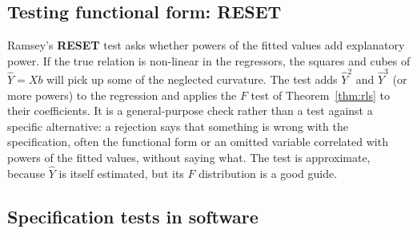 \documentclass[11pt,a4paper]{article}
\numberwithin{equation}{section}
\theoremstyle{definition}
\begin{document}
\subsection{Testing functional form: RESET}
\label{ssec:reset}

Ramsey's \textbf{RESET} test asks whether powers of the fitted values add explanatory power. If the true relation is non-linear in the regressors, the
squares and cubes of $\hat Y = Xb$ will pick up some of the neglected curvature. The test adds $\hat Y^2$ and $\hat Y^3$ (or more powers) to the regression and
applies the $F$ test of Theorem~\ref{thm:rls} to their coefficients. It is a general-purpose check rather than a test against a specific alternative: a
rejection says that something is wrong with the specification, often the functional form or an omitted variable correlated with powers of the
fitted values, without saying what. The test is approximate, because $\hat Y$ is itself estimated, but its $F$ distribution is a good guide.

\subsection{Specification tests in software}
\label{ssec:software8}
\end{document}
